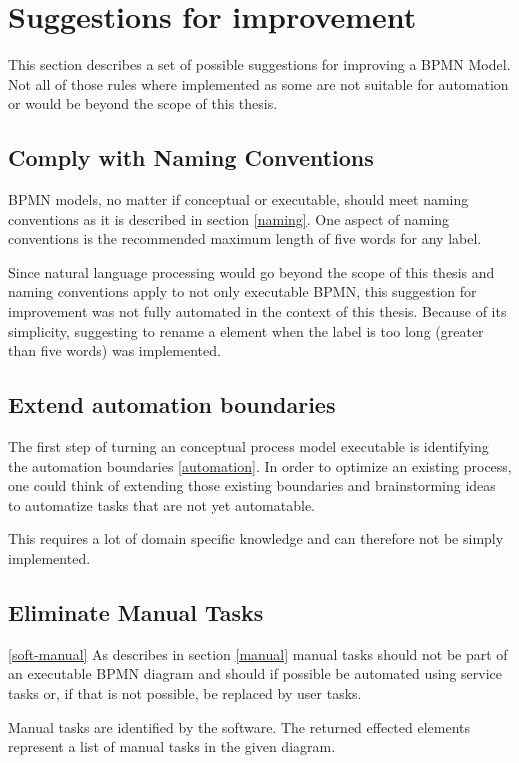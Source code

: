 \section{Suggestions for improvement}\label{last}
This section describes a set of possible suggestions for improving a BPMN Model. Not all of those rules where implemented as some are not suitable for automation or would be beyond the scope of this thesis. 

\subsection{Comply with Naming Conventions}\label{naming-con}
BPMN models, no matter if conceptual or executable, should meet naming conventions as it is described in section \ref{naming}. One aspect of naming conventions is the recommended maximum length of five words for any label. 

Since natural language processing would go beyond the scope of this thesis and naming conventions apply to not only executable BPMN, this suggestion for improvement was not fully automated in the context of this thesis. Because of its simplicity, suggesting to rename a element when the label is too long (greater than five words) was implemented.

\subsection{Extend automation boundaries}
The first step of turning an conceptual process model executable is identifying the automation boundaries \ref{automation}. In order to optimize an existing process, one could think of extending those existing boundaries and brainstorming ideas to automatize tasks that are not yet automatable. 

This requires a lot of domain specific knowledge and can therefore not be simply implemented.

\subsection{Eliminate Manual Tasks}\ref{soft-manual}
As describes in section \ref{manual} manual tasks should not be part of an executable BPMN diagram and should if possible be automated using service tasks or, if that is not possible, be replaced by user tasks. 

Manual tasks are identified by the software. The returned effected elements represent a list of manual tasks in the given diagram.

